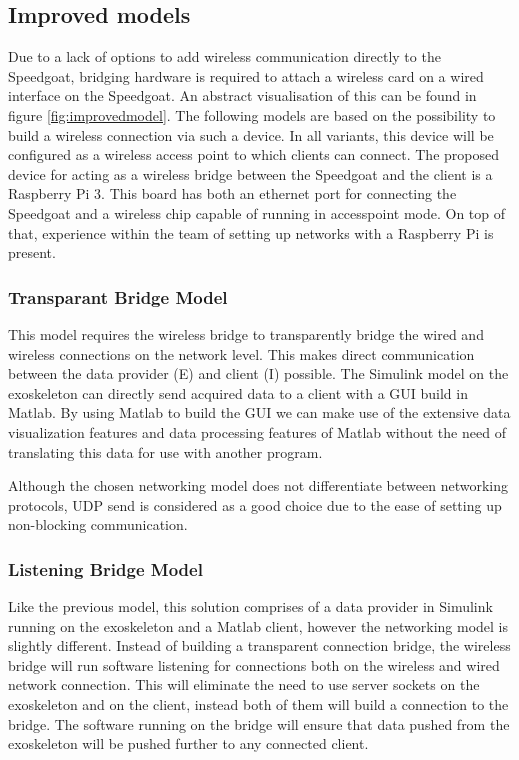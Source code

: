 \subsection{Improved models} \label{sec:impmod}
Due to a lack of options to add wireless communication directly to the Speedgoat, bridging hardware is required to attach a wireless card on a wired interface on the Speedgoat. An abstract visualisation of this can be found in figure \ref{fig:improvedmodel}. The following models are based on the possibility to build a wireless connection via such a device. In all variants, this device will be configured as a wireless access point to which clients can connect.
The proposed device for acting as a wireless bridge between the Speedgoat and the client is a Raspberry Pi 3. This board has both an ethernet port for connecting the Speedgoat and a wireless chip capable of running in accesspoint mode. On top of that, experience within the team of setting up networks with a Raspberry Pi is present.

\subsubsection{Transparant Bridge Model}\label{sec:tbm}
This model requires the wireless bridge to transparently bridge the wired and wireless connections on the network level. This makes direct communication between the data provider (E) and client (I) possible. The Simulink model on the exoskeleton can directly send acquired data to a client with a GUI build in Matlab. By using Matlab to build the GUI we can make use of the extensive data visualization features and data processing features of Matlab without the need of translating this data for use with another program. 

Although the chosen networking model does not differentiate between networking protocols, UDP send \cite{web:UDPSend} is considered as a good choice due to the ease of setting up non-blocking communication.

\subsubsection{Listening Bridge Model}\label{sec:lbm}
Like the previous model, this solution comprises of a data provider in Simulink running on the exoskeleton and a Matlab client, however the networking model is slightly different. Instead of building a transparent connection bridge, the wireless bridge will run software listening for connections both on the wireless and wired network connection. This will eliminate the need to use server sockets on the exoskeleton and on the client, instead both of them will build a connection to the bridge. The software running on the bridge will ensure that data pushed from the exoskeleton will be pushed further to any connected client.

